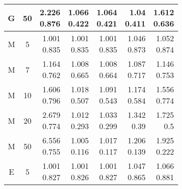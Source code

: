 \documentclass{article}
\begin{document}
\begin{tabular}{|c c|r r r r r|}
  \hline
  G & 50 & \shortstack{ 2.226 \\ 0.876 } & \shortstack{ 1.066 \\ 0.422 } & \shortstack{ 1.064 \\ 0.421 } & \shortstack{ 1.04 \\ 0.411 } & \shortstack{ 1.612 \\ 0.636 } \\ 
  \hline\hline
  M & 5 & \shortstack{ 1.001 \\ 0.835 } & \shortstack{ 1.001 \\ 0.835 } & \shortstack{ 1.001 \\ 0.835 } & \shortstack{ 1.046 \\ 0.873 } & \shortstack{ 1.052 \\ 0.874 } \\ 
  \hline
  M & 7 & \shortstack{ 1.164 \\ 0.762 } & \shortstack{ 1.008 \\ 0.665 } & \shortstack{ 1.008 \\ 0.664 } & \shortstack{ 1.087 \\ 0.717 } & \shortstack{ 1.146 \\ 0.753 } \\ 
  \hline
  M & 10 & \shortstack{ 1.606 \\ 0.796 } & \shortstack{ 1.018 \\ 0.507 } & \shortstack{ 1.091 \\ 0.543 } & \shortstack{ 1.174 \\ 0.584 } & \shortstack{ 1.556 \\ 0.774 } \\ 
  \hline
  M & 20 & \shortstack{ 2.679 \\ 0.774 } & \shortstack{ 1.012 \\ 0.293 } & \shortstack{ 1.033 \\ 0.299 } & \shortstack{ 1.342 \\ 0.39 } & \shortstack{ 1.725 \\ 0.5 } \\ 
  \hline
  M & 50 & \shortstack{ 6.556 \\ 0.755 } & \shortstack{ 1.005 \\ 0.116 } & \shortstack{ 1.017 \\ 0.117 } & \shortstack{ 1.206 \\ 0.139 } & \shortstack{ 1.925 \\ 0.222 } \\ 
  \hline\hline
  E & 5 & \shortstack{ 1.001 \\ 0.827 } & \shortstack{ 1.001 \\ 0.826 } & \shortstack{ 1.001 \\ 0.827 } & \shortstack{ 1.047 \\ 0.865 } & \shortstack{ 1.066 \\ 0.881 } \\ 

\end{tabular}
\end{document}
